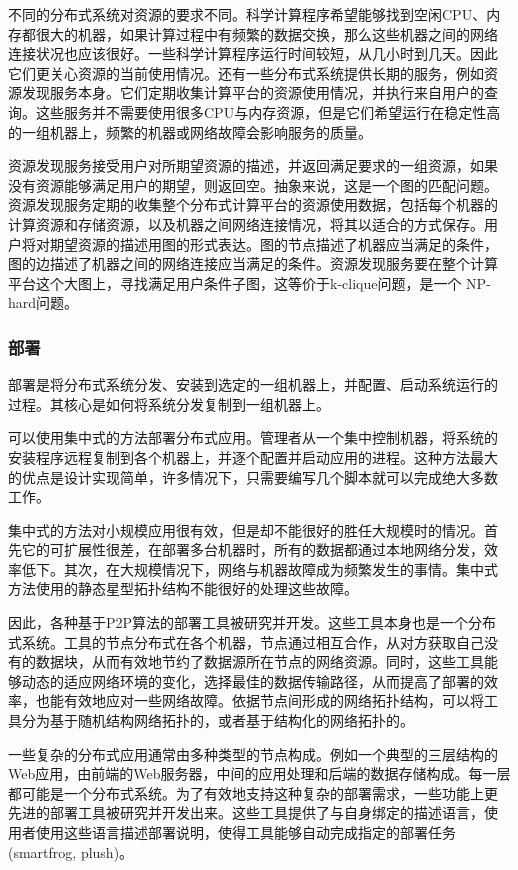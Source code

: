 不同的分布式系统对资源的要求不同。科学计算程序希望能够找到空闲CPU、内
存都很大的机器，如果计算过程中有频繁的数据交换，那么这些机器之间的网络
连接状况也应该很好。一些科学计算程序运行时间较短，从几小时到几天。因此
它们更关心资源的当前使用情况。还有一些分布式系统提供长期的服务，例如资
源发现服务本身。它们定期收集计算平台的资源使用情况，并执行来自用户的查
询。这些服务并不需要使用很多CPU与内存资源，但是它们希望运行在稳定性高
的一组机器上，频繁的机器或网络故障会影响服务的质量。

资源发现服务接受用户对所期望资源的描述，并返回满足要求的一组资源，如果
没有资源能够满足用户的期望，则返回空。抽象来说，这是一个图的匹配问题。
资源发现服务定期的收集整个分布式计算平台的资源使用数据，包括每个机器的
计算资源和存储资源，以及机器之间网络连接情况，将其以适合的方式保存。用
户将对期望资源的描述用图的形式表达。图的节点描述了机器应当满足的条件，
图的边描述了机器之间的网络连接应当满足的条件。资源发现服务要在整个计算
平台这个大图上，寻找满足用户条件子图，这等价于k-clique问题，是一个
NP-hard问题。

\subsubsection*{部署}

部署是将分布式系统分发、安装到选定的一组机器上，并配置、启动系统运行的
过程。其核心是如何将系统分发复制到一组机器上。

可以使用集中式的方法部署分布式应用。管理者从一个集中控制机器，将系统的
安装程序远程复制到各个机器上，并逐个配置并启动应用的进程。这种方法最大
的优点是设计实现简单，许多情况下，只需要编写几个脚本就可以完成绝大多数
工作。

集中式的方法对小规模应用很有效，但是却不能很好的胜任大规模时的情况。首
先它的可扩展性很差，在部署多台机器时，所有的数据都通过本地网络分发，效
率低下。其次，在大规模情况下，网络与机器故障成为频繁发生的事情。集中式
方法使用的静态星型拓扑结构不能很好的处理这些故障。

因此，各种基于P2P算法的部署工具被研究并开发。这些工具本身也是一个分布
式系统。工具的节点分布式在各个机器，节点通过相互合作，从对方获取自己没
有的数据块，从而有效地节约了数据源所在节点的网络资源。同时，这些工具能
够动态的适应网络环境的变化，选择最佳的数据传输路径，从而提高了部署的效
率，也能有效地应对一些网络故障。依据节点间形成的网络拓扑结构，可以将工
具分为基于随机结构网络拓扑的，或者基于结构化的网络拓扑的。

一些复杂的分布式应用通常由多种类型的节点构成。例如一个典型的三层结构的
Web应用，由前端的Web服务器，中间的应用处理和后端的数据存储构成。每一层
都可能是一个分布式系统。为了有效地支持这种复杂的部署需求，一些功能上更
先进的部署工具被研究并开发出来。这些工具提供了与自身绑定的描述语言，使
用者使用这些语言描述部署说明，使得工具能够自动完成指定的部署任务
(smartfrog, plush)。

